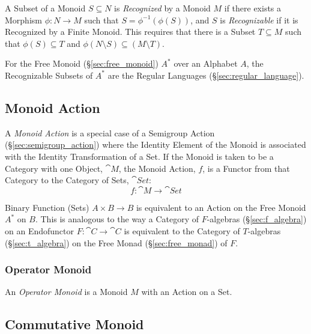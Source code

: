 A Subset of a Monoid $S \subseteq N$ is \emph{Recognized} by a Monoid $M$ if
there exists a Morphism $\phi : N \rightarrow M$ such that $S =
\phi^{-1}(\phi(S))$, and $S$ is \emph{Recognizable} if it is Recognized by a
Finite Monoid. This requires that there is a Subset $T \subseteq M$ such that
$\phi(S) \subseteq T$ and $\phi(N \setminus S) \subseteq (M \setminus T)$.

For the Free Monoid (\S\ref{sec:free_monoid}) $A^*$ over an Alphabet
$A$, the Recognizable Subsets of $A^*$ are the Regular Languages
(\S\ref{sec:regular_language}).



\subsection{Monoid Action}\label{sec:monoid_action}

A \emph{Monoid Action} is a special case of a Semigroup Action
(\S\ref{sec:semigroup_action}) where the Identity Element of the
Monoid is associated with the Identity Transformation of a Set. If the
Monoid is taken to be a Category with one Object, $\cat{M}$, the
Monoid Action, $f$, is a Functor from that Category to the Category of
Sets, $\cat{Set}$:
\[
  f : \cat{M} \rightarrow \cat{Set}
\]

Binary Function (Sets) $A \times B \rightarrow B$ is equivalent to an
Action on the Free Monoid $A^*$ on $B$. This is analogous to the way a
Category of $F$-algebras (\S\ref{sec:f_algebra}) on an Endofunctor $F
: \cat{C} \rightarrow \cat{C}$ is equivalent to the Category of
$T$-algebras (\S\ref{sec:t_algebra}) on the Free Monad
(\S\ref{sec:free_monad}) of $F$.



\subsubsection{Operator Monoid}\label{sec:operator_monoid}

An \emph{Operator Monoid} is a Monoid $M$ with an Action on a Set.



\subsection{Commutative Monoid}\label{sec:commutative_monoid}


